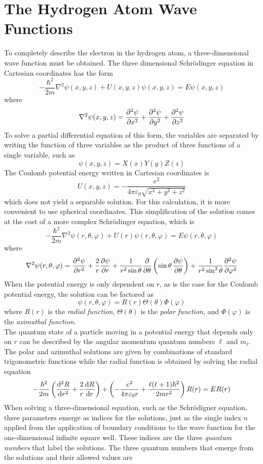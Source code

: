 \documentclass{subfiles}
\begin{document}
	\section{The Hydrogen Atom Wave Functions}
		To completely describe the electron in the hydrogen atom, a three-dimensional wave function must be obtained. The three dimensional Schr\"odinger equation in Cartesian coordinates has the form
			\[-\frac{\hbar^2}{2m}\nabla^2\psi(x, y, z) + U(x, y, z)\psi(x, y, z) = E\psi(x, y, z)\]
			where
			\[\nabla^2\psi(x, y, z) = \pdv[2]{\psi}{x} + \pdv[2]{\psi}{y} + \pdv[2]{\psi}{z}\]
			To solve a partial differential equation of this form, the variables are separated by writing the function of three variables as the product of three functions of a single variable, such as
			\[\psi(x, y, z) = X(x)Y(y)Z(z)\]
			The Coulomb potential energy written in Cartesian coordinates is
			\[U(x, y, z) = -\frac{e^2}{4\pi\varepsilon_0\sqrt{x^2 + y^2 + z^2}}\]
			which does not yield a separable solution. For this calculation, it is more convenient to use spherical coordinates. This simplification of the solution comes at the cost of a more complex Schr\"odinger equation, which is
			\[-\frac{\hbar^2}{2m}\nabla^2\psi(r, \theta, \varphi) + U(r)\psi(r, \theta, \varphi) = E\psi(r, \theta, \varphi)\]
			where
			\[\nabla^2\psi(r, \theta, \varphi) = \pdv[2]{\psi}{r} + \frac{2}{r}\pdv{\psi}{r} + \frac{1}{r^2\sin\theta}\pdv{\theta}\left(\sin\theta\,\pdv{\psi}{\theta}\right) + \frac{1}{r^2\sin^2\theta}\pdv[2]{\psi}{\varphi}\]
			When the potential energy is only dependent on \(r\), as is the case for the Coulomb potential energy, the solution can be factored as
			\[\psi(r, \theta, \varphi) = R(r)\Theta(\theta)\Phi(\varphi)\]
			where \(R(r)\) is the \textit{radial function}, \(\Theta(\theta)\) is the \textit{polar function}, and \(\Phi(\varphi)\) is the \textit{azimuthal function}. \\
			The quantum state of a particle moving in a potential energy that depends only on \(r\) can be described by the angular momentum quantum numbers \(\ell\) and \(m_\ell\). \\
			The polar and azimuthal solutions are given by combinations of standard trigonometric functions while the radial function is obtained by solving the radial equation
			\[-\frac{\hbar^2}{2m}\left(\dv[2]{R}{r} + \frac{2}{r}\dv{R}{r}\right) + \left(-\frac{e^2}{4\pi\varepsilon_0r} + \frac{\ell(\ell + 1)\hbar^2}{2mr^2}\right)R(r) = ER(r)\]
			When solving a three-dimensional equation, such as the Schr\"odigner equation, three parameters emerge as indices for the solutions, just as the single index \(n\) applied from the application of boundary conditions to the wave function for the one-dimensional infinite square well. These indices are the three \textit{quantum numbers} that label the solutions. The three quantum numbers that emerge from the solutions and their allowed values are
\end{document}
